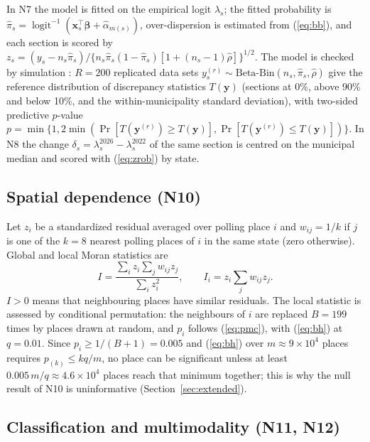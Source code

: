 In N7 the model is fitted on the empirical logit $\lambda_s$; the fitted
probability is $\hat\pi_s=\operatorname{logit}^{-1}(\mathbf x_s^\top\hat{\boldsymbol\beta}+\hat\alpha_{m(s)})$,
over-dispersion is estimated from (\ref{eq:bb}), and each section is scored
by $z_s=(y_s-n_s\hat\pi_s)/\{n_s\hat\pi_s(1-\hat\pi_s)[1+(n_s-1)\hat\rho]\}^{1/2}$.
The model is checked by simulation \cite{rubin1984,gelman1996}: $R=200$
replicated data sets $y^{(r)}_s\sim\text{Beta-Bin}(n_s,\hat\pi_s,\hat\rho)$
give the reference distribution of discrepancy statistics $T(\mathbf y)$
(sections at 0\%, above 90\% and below 10\%, and the within-municipality
standard deviation), with two-sided predictive $p$-value
$p=\min\{1,2\min(\Pr[T(\mathbf y^{(r)})\geq T(\mathbf y)],\Pr[T(\mathbf y^{(r)})\leq T(\mathbf y)])\}$.
In N8 the change $\delta_s=\lambda^{2026}_s-\lambda^{2022}_s$ of the same
section is centred on the municipal median and scored with (\ref{eq:zrob})
by state.

\subsection{Spatial dependence (N10)}

Let $z_i$ be a standardized residual averaged over polling place $i$ and
$w_{ij}=1/k$ if $j$ is one of the $k=8$ nearest polling places of $i$ in
the same state (zero otherwise). Global and local Moran statistics are
\cite{moran1950,anselin1995}
\begin{equation}
I=\frac{\sum_i z_i\sum_j w_{ij}z_j}{\sum_i z_i^2},\qquad
I_i=z_i\sum_j w_{ij}z_j .
\label{eq:moran}
\end{equation}
$I>0$ means that neighbouring places have similar residuals. The local
statistic is assessed by conditional permutation: the neighbours of $i$
are replaced $B=199$ times by places drawn at random, and $p_i$ follows
(\ref{eq:pmc}), with (\ref{eq:bh}) at $q=0.01$. Since $p_i\geq1/(B+1)=0.005$
and (\ref{eq:bh}) over $m\approx9\times10^4$ places requires
$p_{(k)}\leq kq/m$, no place can be significant unless at least
$0.005\,m/q\approx4.6\times10^4$ places reach that minimum together; this
is why the null result of N10 is
uninformative (Section~\ref{sec:extended}).

\subsection{Classification and multimodality (N11, N12)}


